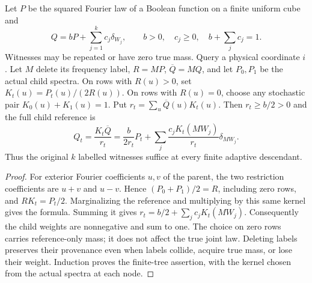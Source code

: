 \begin{lemma}
\label{lem:v11-ghost}
Let $P$ be the squared Fourier law of a Boolean function on a finite uniform cube and
\[
 Q=bP+\sum_{j=1}^k c_j\delta_{W_j},\qquad
 b>0,\quad c_j\geq0,\quad b+\sum_jc_j=1.
\]
Witnesses may be repeated or have zero true mass. Query a physical coordinate $i$.
Let $M$ delete its frequency label, $R=MP$, $\overline Q=MQ$, and let $P_0,P_1$
be the actual child spectra. On rows with $R(u)>0$, set $K_t(u)=P_t(u)/(2R(u))$.
On rows with $R(u)=0$, choose any stochastic pair $K_0(u)+K_1(u)=1$.
Put $r_t=\sum_u\overline Q(u)K_t(u)$. Then $r_t\geq b/2>0$ and the full child reference is
\[
 Q_t=\frac{K_t\overline Q}{r_t}
 =\frac b{2r_t}P_t+
 \sum_j\frac{c_jK_t(MW_j)}{r_t}\delta_{MW_j}.
\]
Thus the original $k$ labelled witnesses suffice at every finite adaptive descendant.
\end{lemma}
\begin{proof}
For exterior Fourier coefficients $u,v$ of the parent, the two restriction coefficients
are $u+v$ and $u-v$. Hence $(P_0+P_1)/2=R$, including zero rows, and $RK_t=P_t/2$.
Marginalizing the reference and multiplying by this same kernel gives the formula.
Summing it gives $r_t=b/2+\sum_jc_jK_t(MW_j)$. Consequently the child weights are
nonnegative and sum to one. The choice on zero rows carries reference-only mass; it
does not affect the true joint law. Deleting labels preserves their provenance even
when labels collide, acquire true mass, or lose their weight. Induction proves the
finite-tree assertion, with the kernel chosen from the actual spectra at each node.
\end{proof}


